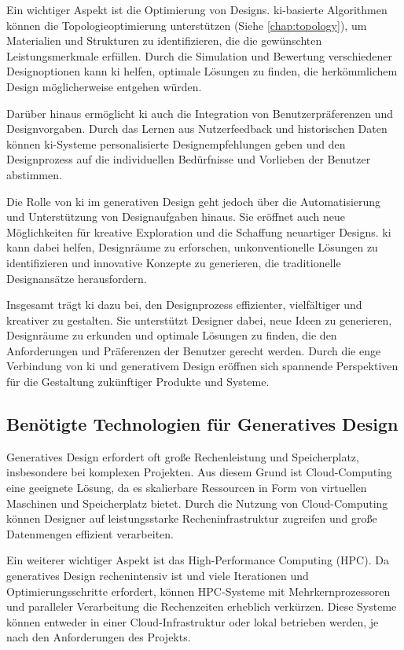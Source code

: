 Ein wichtiger Aspekt ist die Optimierung von Designs. \ac{ki}-basierte Algorithmen können die Topologieoptimierung unterstützen (Siehe \autoref{chap:topology}), um Materialien und Strukturen zu identifizieren, die die gewünschten Leistungsmerkmale erfüllen. Durch die Simulation und Bewertung verschiedener Designoptionen kann \ac{ki} helfen, optimale Lösungen zu finden, die herkömmlichem Design möglicherweise entgehen würden.

Darüber hinaus ermöglicht \ac{ki} auch die Integration von Benutzerpräferenzen und Designvorgaben. Durch das Lernen aus Nutzerfeedback und historischen Daten können \ac{ki}-Systeme personalisierte Designempfehlungen geben und den Designprozess auf die individuellen Bedürfnisse und Vorlieben der Benutzer abstimmen.

Die Rolle von \ac{ki} im generativen Design geht jedoch über die Automatisierung und Unterstützung von Designaufgaben hinaus. Sie eröffnet auch neue Möglichkeiten für kreative Exploration und die Schaffung neuartiger Designs. \ac{ki} kann dabei helfen, Designräume zu erforschen, unkonventionelle Lösungen zu identifizieren und innovative Konzepte zu generieren, die traditionelle Designansätze herausfordern.

Insgesamt trägt \ac{ki} dazu bei, den Designprozess effizienter, vielfältiger und kreativer zu gestalten. Sie unterstützt Designer dabei, neue Ideen zu generieren, Designräume zu erkunden und optimale Lösungen zu finden, die den Anforderungen und Präferenzen der Benutzer gerecht werden. Durch die enge Verbindung von \ac{ki} und generativem Design eröffnen sich spannende Perspektiven für die Gestaltung zukünftiger Produkte und Systeme. \autocite*{21} \autocite*{22}

\subsection*{Benötigte Technologien für Generatives Design}
Generatives Design erfordert oft große Rechenleistung und Speicherplatz, insbesondere bei komplexen Projekten. Aus diesem Grund ist Cloud-Computing eine geeignete Lösung, da es skalierbare Ressourcen in Form von virtuellen Maschinen und Speicherplatz bietet. Durch die Nutzung von Cloud-Computing können Designer auf leistungsstarke Recheninfrastruktur zugreifen und große Datenmengen effizient verarbeiten.

Ein weiterer wichtiger Aspekt ist das High-Performance Computing (HPC). Da generatives Design rechenintensiv ist und viele Iterationen und Optimierungsschritte erfordert, können HPC-Systeme mit Mehrkernprozessoren und paralleler Verarbeitung die Rechenzeiten erheblich verkürzen. Diese Systeme können entweder in einer Cloud-Infrastruktur oder lokal betrieben werden, je nach den Anforderungen des Projekts.

